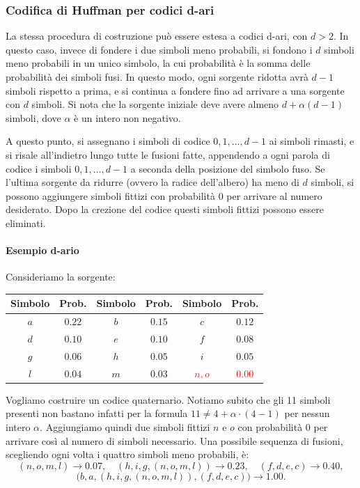 \documentclass{article}
\theoremstyle{definition}
\numberwithin{equation}{section}
\begin{document}
\subsubsection{Codifica di Huffman per codici d-ari}
La stessa procedura di costruzione può essere estesa a codici d-ari, con $d>2$. In questo caso, invece di fondere i due simboli meno probabili, si fondono i $d$ simboli meno probabili in un unico simbolo, la cui probabilità è la somma delle probabilità dei simboli fusi. In questo modo, ogni sorgente ridotta avrà $d-1$ simboli rispetto a prima, e si continua a fondere fino ad arrivare a una sorgente con $d$ simboli. Si nota che la sorgente iniziale deve avere almeno $d+\alpha(d-1)$ simboli, dove $\alpha$ è un intero non negativo.

A questo punto, si assegnano i simboli di codice $0,1,\ldots,d-1$ ai simboli rimasti, e si risale all'indietro lungo tutte le fusioni fatte, appendendo a ogni parola di codice i simboli $0,1,\ldots,d-1$ a seconda della posizione del simbolo fuso. Se l'ultima sorgente da ridurre (ovvero la radice dell'albero) ha meno di $d$ simboli, si possono aggiungere simboli fittizi con probabilità $0$ per arrivare al numero desiderato. Dopo la crezione del codice questi simboli fittizi possono essere eliminati.

\paragraph{Esempio d-ario}
Consideriamo la sorgente:
\begin{center}
    \begin{tabular}{|c|c||c|c||c|c|}
        \hline
        \textbf{Simbolo} & \textbf{Prob.} &
        \textbf{Simbolo} & \textbf{Prob.} &
        \textbf{Simbolo} & \textbf{Prob.}                                                                   \\ \hline
        $a$              & $0.22$         & $b$ & $0.15$ & $c$                    & $0.12$                  \\ \hline
        $d$              & $0.10$         & $e$ & $0.10$ & $f$                    & $0.08$                  \\ \hline
        $g$              & $0.06$         & $h$ & $0.05$ & $i$                    & $0.05$                  \\ \hline
        $l$              & $0.04$         & $m$ & $0.03$ & \textcolor{red}{$n,o$} & \textcolor{red}{$0.00$} \\ \hline
    \end{tabular}
\end{center}
Vogliamo costruire un codice quaternario. Notiamo subito che gli 11 simboli presenti non bastano infatti per la formula $11 \neq 4 + \alpha\cdot (4-1)$ per nessun intero $\alpha$. Aggiungiamo quindi due simboli fittizi $n$ e $o$ con probabilità $0$ per arrivare così al numero di simboli necessario. Una possibile sequenza di fusioni, scegliendo ogni volta i quattro simboli meno probabili, è:
\[
    (n,o,m,l) \rightarrow 0.07,
    \quad
    (h,i,g,(n,o,m,l)) \rightarrow 0.23,
    \quad
    (f,d,e,c) \rightarrow 0.40,
\]
\[
    \bigl(b,a,(h,i,g,(n,o,m,l)),(f,d,e,c)\bigr)  \rightarrow 1.00.
\]
\end{document}
